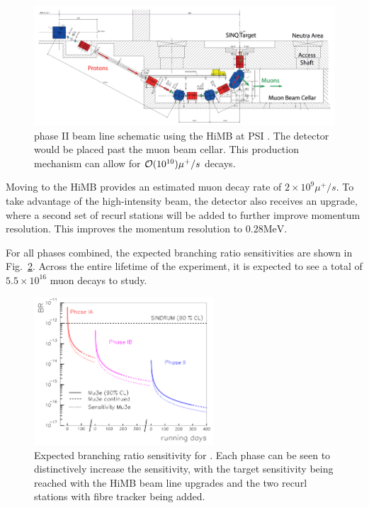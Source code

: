 \begin{figure}[h]
    \centering
    \includegraphics[width = \textwidth]{Figures/experiments/mu3e_phase2_schematic.png}
    \caption{\mueee phase II beam line schematic using the HiMB at PSI \cite{Blondel:2013ia}.
    The \mueee detector would be placed past the muon beam cellar.
    This production mechanism can allow for $\operatorname{\mathcal{O}}(10^{10})\mu^+/s$ decays.}
    \label{fig:mu3e_phaseII_schematic}
\end{figure}

\noindent Moving to the HiMB provides an estimated muon decay rate of $2 \times 10^9 \mu^+/s$.
To take advantage of the high-intensity beam, the detector also receives an upgrade, where a second set of recurl stations will be added to further improve momentum resolution.
This improves the momentum resolution to $0.28\textrm{MeV}$.

For all phases combined, the expected branching ratio sensitivities are shown in Fig.\ \ref{fig:mu3e_br_limits}.
Across the entire lifetime of the experiment, it is expected to see a total of $5.5 \times 10^{16}$ muon decays to study.

\begin{figure}[h]
    \centering
    \includegraphics[width = 0.6\textwidth]{Figures/experiments/mu3e_br_limits.png}
    \caption{Expected branching ratio sensitivity for \mueee \cite{Blondel:2013ia}.
    Each phase can be seen to distinctively increase the sensitivity, with the target sensitivity being reached with the HiMB beam line upgrades and the two recurl stations with fibre tracker being added.}
    \label{fig:mu3e_br_limits}
\end{figure}
